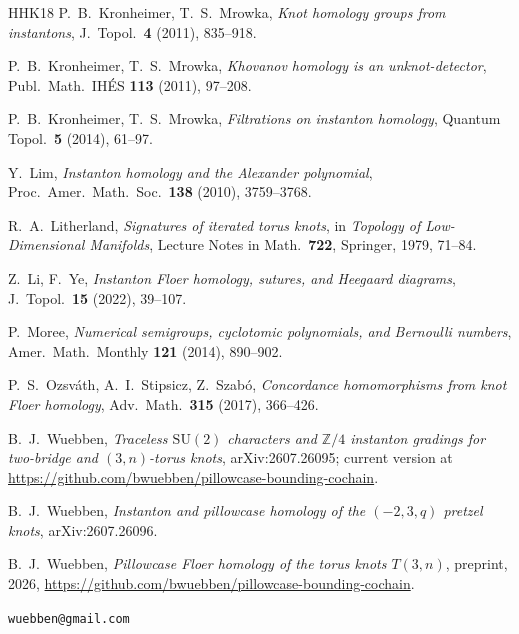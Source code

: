 \documentclass[11pt,reqno]{amsart}
\theoremstyle{plain}
\theoremstyle{definition}
\begin{document}
\begin{thebibliography}{HHK18}
 P.~B.~Kronheimer, T.~S.~Mrowka, \emph{Knot homology groups from instantons}, J.\
Topol.\ \textbf{4} (2011), 835--918.

 P.~B.~Kronheimer, T.~S.~Mrowka, \emph{Khovanov homology is an unknot-detector},
Publ.\ Math.\ IH\'ES \textbf{113} (2011), 97--208.

 P.~B.~Kronheimer, T.~S.~Mrowka, \emph{Filtrations on instanton homology}, Quantum
Topol.\ \textbf{5} (2014), 61--97.

 Y.~Lim, \emph{Instanton homology and the Alexander polynomial}, Proc.\ Amer.\
Math.\ Soc.\ \textbf{138} (2010), 3759--3768.

 R.~A.~Litherland, \emph{Signatures of iterated torus knots}, in
\emph{Topology of Low-Dimensional Manifolds}, Lecture Notes in Math.\ \textbf{722}, Springer, 1979,
71--84.

 Z.~Li, F.~Ye, \emph{Instanton Floer homology, sutures, and Heegaard diagrams}, J.\
Topol.\ \textbf{15} (2022), 39--107.

\bibitem[Mor14]{Moree} P.~Moree, \emph{Numerical semigroups, cyclotomic polynomials, and Bernoulli numbers},
Amer.\ Math.\ Monthly \textbf{121} (2014), 890--902.

\bibitem[OSS17]{OSS} P.~S.~Ozsv\'ath, A.~I.~Stipsicz, Z.~Szab\'o, \emph{Concordance homomorphisms from knot
Floer homology}, Adv.\ Math.\ \textbf{315} (2017), 366--426.


 B.~J.~Wuebben, \emph{Traceless $\mathrm{SU}(2)$ characters and $\mathbb{Z}/4$ instanton
gradings for two-bridge and $(3,n)$-torus knots}, arXiv:2607.26095; current version at \url{https://github.com/bwuebben/pillowcase-bounding-cochain}.

\bibitem[Wue26b]{WuebbenII} B.~J.~Wuebben, \emph{Instanton and pillowcase homology of the $(-2,3,q)$ pretzel
knots}, arXiv:2607.26096.

\bibitem[Wue26c]{Wpill} B.~J.~Wuebben, \emph{Pillowcase Floer homology of the torus knots $T(3,n)$}, preprint,
2026, \url{https://github.com/bwuebben/pillowcase-bounding-cochain}.

\end{thebibliography}

\bigskip
{} \texttt{wuebben@gmail.com}
\end{document}
